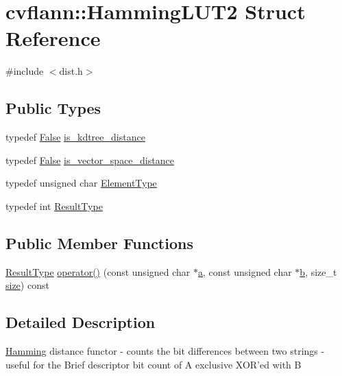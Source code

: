 \hypertarget{structcvflann_1_1HammingLUT2}{\section{cvflann\-:\-:Hamming\-L\-U\-T2 Struct Reference}
\label{structcvflann_1_1HammingLUT2}
}


{\ttfamily \#include $<$dist.\-h$>$}

\subsection*{Public Types}
\begin{DoxyCompactItemize}
\item 
typedef \hyperlink{classcvflann_1_1False}{False} \hyperlink{structcvflann_1_1HammingLUT2_a820002d9bc643ea44980001e7e67e4cf}{is\-\_\-kdtree\-\_\-distance}
\item 
typedef \hyperlink{classcvflann_1_1False}{False} \hyperlink{structcvflann_1_1HammingLUT2_a58948f2e905cade31416d5daa98f1d0b}{is\-\_\-vector\-\_\-space\-\_\-distance}
\item 
typedef unsigned char \hyperlink{structcvflann_1_1HammingLUT2_a055b0a7a52a889073ce9a8ede7274f0f}{Element\-Type}
\item 
typedef int \hyperlink{structcvflann_1_1HammingLUT2_ae3baeeac36b73addbd4d278444e2ecc8}{Result\-Type}
\end{DoxyCompactItemize}
\subsection*{Public Member Functions}
\begin{DoxyCompactItemize}
\item 
\hyperlink{structcvflann_1_1HammingLUT2_ae3baeeac36b73addbd4d278444e2ecc8}{Result\-Type} \hyperlink{structcvflann_1_1HammingLUT2_a333426f044845ca7fa7486070dfeef86}{operator()} (const unsigned char $\ast$\hyperlink{legacy_8hpp_a1031d0e0a97a340abfe0a6ab9e831045}{a}, const unsigned char $\ast$\hyperlink{legacy_8hpp_ac04272e8ca865b8fba18d36edae9fd2a}{b}, size\-\_\-t \hyperlink{legacy_8hpp_ae97003f8d5c64cdfb99f6f2606d121b6}{size}) const 
\end{DoxyCompactItemize}


\subsection{Detailed Description}
\hyperlink{structcvflann_1_1Hamming}{Hamming} distance functor -\/ counts the bit differences between two strings -\/ useful for the Brief descriptor bit count of A exclusive X\-O\-R'ed with B 

